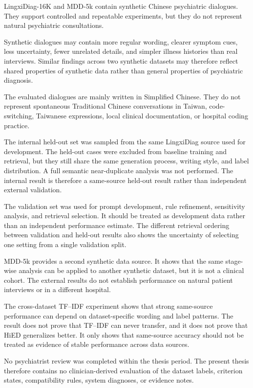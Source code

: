 \documentclass[12pt,a4paper,oneside]{report}
\begin{document}
LingxiDiag-16K and MDD-5k contain synthetic Chinese psychiatric
dialogues. They support controlled and repeatable experiments, but they
do not represent natural psychiatric consultations.

Synthetic dialogues may contain more regular wording, clearer symptom
cues, less uncertainty, fewer unrelated details, and simpler illness
histories than real interviews. Similar findings across two synthetic
datasets may therefore reflect shared properties of synthetic data
rather than general properties of psychiatric diagnosis.

The evaluated dialogues are mainly written in Simplified Chinese. They
do not represent spontaneous Traditional Chinese conversations in
Taiwan, code-switching, Taiwanese expressions, local clinical
documentation, or hospital coding practice.

The internal held-out set was sampled from the same LingxiDiag source
used for development. The held-out cases were excluded from baseline
training and retrieval, but they still share the same generation
process, writing style, and label distribution. A full semantic
near-duplicate analysis was not performed. The internal result is
therefore a same-source held-out result rather than independent external
validation.

The validation set was used for prompt development, rule refinement,
sensitivity analysis, and retrieval selection. It should be treated as
development data rather than an independent performance estimate. The
different retrieval ordering between validation and held-out results
also shows the uncertainty of selecting one setting from a single
validation split.

MDD-5k provides a second synthetic data source. It shows that the same
stage-wise analysis can be applied to another synthetic dataset, but it
is not a clinical cohort. The external results do not establish
performance on natural patient interviews or in a different hospital.

The cross-dataset TF--IDF experiment shows that strong same-source
performance can depend on dataset-specific wording and label patterns.
The result does not prove that TF--IDF can never transfer, and it does
not prove that HiED generalizes better. It only shows that same-source
accuracy should not be treated as evidence of stable performance across
data sources.

No psychiatrist review was completed within the thesis period. The
present thesis therefore contains no clinician-derived evaluation of
the dataset labels, criterion states, compatibility rules, system
diagnoses, or evidence notes.
\end{document}

